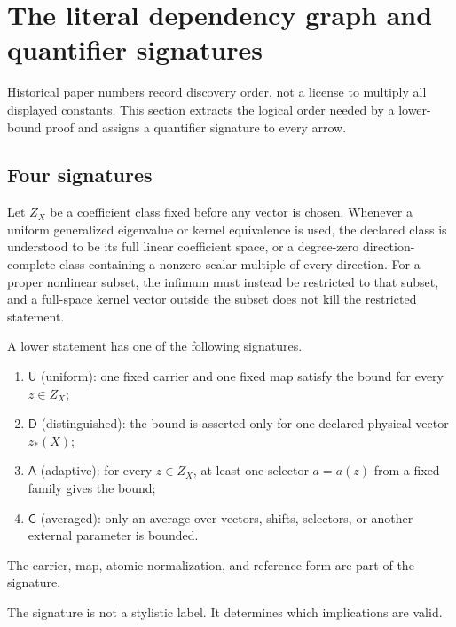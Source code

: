 \section{The literal dependency graph and quantifier signatures}
\label{sec:tpc62-dependency-graph}

Historical paper numbers record discovery order, not a license to multiply
all displayed constants.  This section extracts the logical order needed by
a lower-bound proof and assigns a quantifier signature to every arrow.

\subsection{Four signatures}

Let \(Z_X\) be a coefficient class fixed before any vector is chosen.
Whenever a uniform generalized eigenvalue or kernel equivalence is used,
the declared class is understood to be its full linear coefficient space,
or a degree-zero direction-complete class containing a nonzero scalar
multiple of every direction.  For a proper nonlinear subset, the infimum
must instead be restricted to that subset, and a full-space kernel vector
outside the subset does not kill the restricted statement.

\begin{definition}
\label{def:tpc62-quantifier-signature}
A lower statement has one of the following signatures.
\begin{enumerate}[label=\textup{(\roman*)},leftmargin=3em]
 \item \(\mathsf U\) (uniform): one fixed carrier and one fixed map satisfy
       the bound for every \(z\in Z_X\);
 \item \(\mathsf D\) (distinguished): the bound is asserted only for one
       declared physical vector \(z_*(X)\);
 \item \(\mathsf A\) (adaptive): for every \(z\in Z_X\), at least one
       selector \(a=a(z)\) from a fixed family gives the bound;
 \item \(\mathsf G\) (averaged): only an average over vectors, shifts,
       selectors, or another external parameter is bounded.
\end{enumerate}
The carrier, map, atomic normalization, and reference form are part of the
signature.
\end{definition}

The signature is not a stylistic label.  It determines which implications
are valid.

